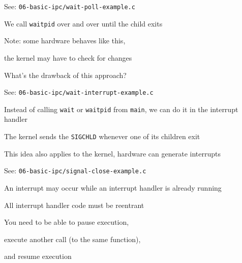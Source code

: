   \begin{slide}


    See: \texttt{06-basic-ipc/wait-poll-example.c}
    \medskip

    We call \texttt{waitpid} over and over until the child exits

    \leftspace{}Note: some hardware behaves like this,

    \leftspace{}\leftspace{}the kernel may have to check for changes
    \bigskip

    What's the drawback of this approach?

  \end{slide}

  \begin{slide}


    See: \texttt{06-basic-ipc/wait-interrupt-example.c}
    \medskip

    Instead of calling \texttt{wait} or \texttt{waitpid} from \texttt{main},
    we can do it in the interrupt handler

    \leftspace{}The kernel sends the \texttt{SIGCHLD} whenever one of its
                  children exit
    \medskip

    This idea also applies to the kernel, hardware can generate interrupts

  \end{slide}

  \begin{slide}


    See: \texttt{06-basic-ipc/signal-close-example.c}
    \medskip

    An interrupt may occur while an interrupt handler is already running
    \bigskip

    All interrupt handler code must be reentrant

    \leftspace{}You need to be able to pause execution,

    \leftspace{}execute another call (to the same function),

    \leftspace{}and resume execution

  \end{slide}


